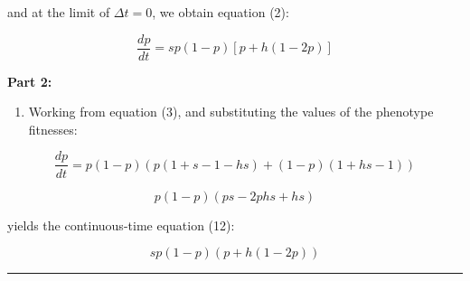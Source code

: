 and at the limit of \(\Delta t = 0\), we obtain equation (2):

\begin{equation} \frac{dp}{dt} = sp(1-p)[p + h(1-2p)] \end{equation}

\textbf{Part 2:}

\begin{enumerate}
\def\labelenumi{\arabic{enumi}.}
\setcounter{enumi}{5}
\tightlist
\item
  Working from equation (3), and substituting the values of the
  phenotype fitnesses:
\end{enumerate}

\begin{equation} \frac{dp}{dt} = p(1-p)(p(1+s - 1-hs) + (1-p)(1+hs-1)) \end{equation}

\begin{equation} p(1-p)(ps - 2phs + hs) \end{equation}

yields the continuous-time equation (12):

\begin{equation} sp(1-p)(p + h(1-2p)) \end{equation}

\begin{center}\rule{0.5\linewidth}{\linethickness}\end{center}
